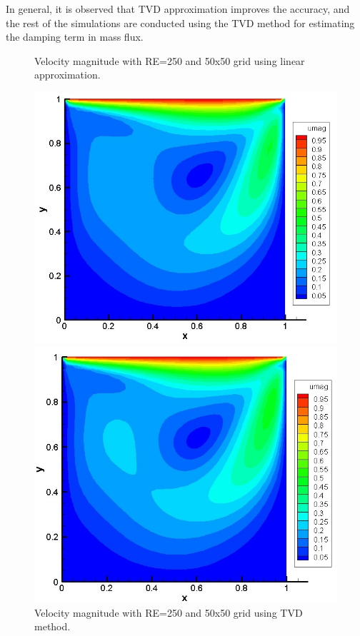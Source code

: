 \documentclass[12pt]{elsarticle}
\begin{document}
	In general, it is observed that TVD approximation improves the accuracy, and the rest of the simulations are conducted using the TVD method for estimating the damping term in mass flux.
	
	\begin{figure}[h]
		\caption{Velocity magnitude with RE=250 and 50x50 grid using linear approximation. }
		\centering\includegraphics[width=0.9\linewidth]{19_50_50_re_250_velocity_linear}
		\caption{Velocity magnitude with RE=250 and 50x50 grid using TVD method. }
		\centering\includegraphics[width=0.9\linewidth]{20_50_50_re_250_velocity_tvd}
	\end{figure}
	
\end{document}
